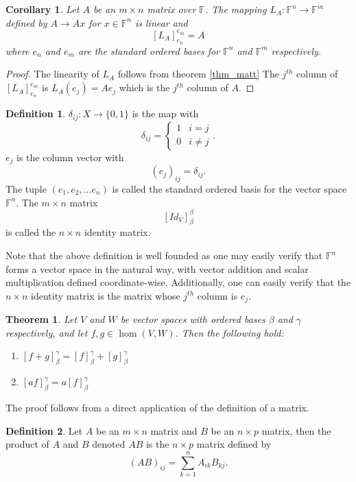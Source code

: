 \documentclass[oneside, 12pt]{book}
\newtheorem{thm}{Theorem}[section]
\newtheorem{cor}{Corollary}[section]
\theoremstyle{definition}
\newtheorem{defn}{Definition}[section]
\begin{document}
\begin{cor}
\label{cor_leftmult}
  Let $A$ be an $m \times n$ matrix over $\mathbb{F}$.
The mapping $L_{A}: \mathbb{F}^{n}\to \mathbb{F}^{m}$ defined by $A \to Ax$ for $x \in \mathbb{F}^{n}$ is linear and \[[L_{A}]_{e_{n}}^{e_{m}}=A\] where $e_{n}$ and $e_{m}$ are the standard ordered bases for $\mathbb{F}^{n}$ and $\mathbb{F}^{m}$ respectively.
\end{cor}
\begin{proof}
  The linearity of $L_{A}$ follows from theorem \ref{thm_matt} The $j^{th}$ column of $[L_{A}]_{e_{n}}^{e_{m}}$ is $L_{A}(e_{j})=Ae_{j}$ which is the $j^{th}$ column of $A$.
\end{proof}
\begin{defn}
\label{defn_id}
  $\delta_{ij}:X \to \{0,1\}$ is the map with \[\delta_{ij}=
  \begin{cases}
    1 & i=j \\
    0 & i\neq j
  \end{cases}.\]
$e_{j}$ is the column vector with \[(e_{j})_{ij}=\delta_{ij}.\]
The tuple $(e_{1}, e_{2}, \dots e_{n})$ is called the standard ordered basis for the vector space $\mathbb{F}^{n}$. The $m \times n$ matrix \[[Id_{V}]_{\beta}^{\beta}\] is called the $n \times n$ identity matrix.

\end{defn}
Note that the above definition is well founded as one may easily verify that $\mathbb{F}^{n}$ forms a vector space in the natural way, with vector addition and scalar multiplication defined coordinate-wise.
Additionally, one can easily verify that the $n \times n$ identity matrix is the matrix whose $j^{th}$ column is $e_{j}$.
\begin{thm}
\label{thm_matsum}
  Let $V$ and $W$ be vector spaces with ordered bases $\beta$ and $\gamma$ respectively, and let $f,g \in \hom(V,W)$. Then the following hold:
  \begin{enumerate}
          \item $[f+g]_{\beta}^{\gamma}=[f]_{\beta}^{\gamma}+[g]_{\beta}^{\gamma}$
          \item $[af]_{\beta}^{\gamma}=a[f]_{\beta}^{\gamma}$
  \end{enumerate}
\end{thm}
The proof follows from a direct application of the definition of a matrix.
\begin{defn}
\label{defn_matprod}
  Let $A$ be an $m \times n$ matrix and $B$ be an $n \times p$ matrix, then the product of $A$ and $B$ denoted $AB$ is the $n \times p$ matrix defined by
  \[(AB)_{ij}=\sum_{k=1}^{n}A_{ik}B_{kj}.\]
\end{defn}
\end{document}
